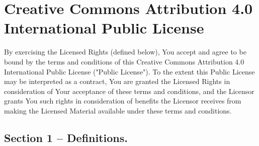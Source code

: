 \section{Creative Commons Attribution 4.0 International Public License}

By exercising the Licensed Rights (defined below), You accept and agree to be bound by the terms and conditions of this Creative Commons Attribution 4.0 International Public License ("Public License"). To the extent this Public License may be interpreted as a contract, You are granted the Licensed Rights in consideration of Your acceptance of these terms and conditions, and the Licensor grants You such rights in consideration of benefits the Licensor receives from making the Licensed Material available under these terms and conditions.

\subsection{Section 1 – Definitions.}

